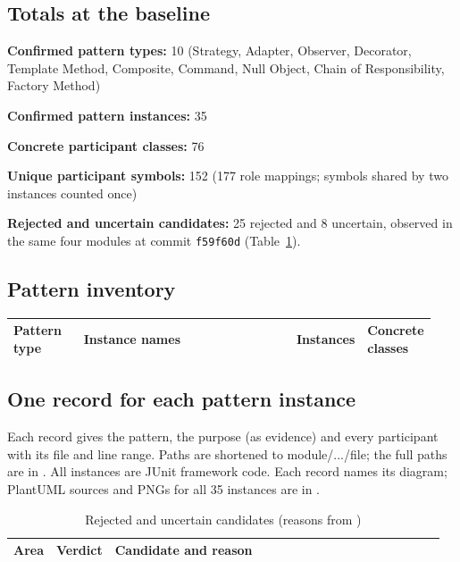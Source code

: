 \documentclass[11pt,a4paper]{article}
\newcommand{\entry}[1]{\textbf{#1:} }
\begin{document}
\subsection{Totals at the baseline}
\entry{Confirmed pattern types}10 (Strategy, Adapter, Observer, Decorator, Template Method, Composite, Command, Null Object, Chain of Responsibility, Factory Method)\par
\entry{Confirmed pattern instances}35\par
\entry{Concrete participant classes}76\par
\entry{Unique participant symbols}152 (177 role mappings; symbols shared by two instances counted once)\par
\entry{Rejected and uncertain candidates}25 rejected and 8 uncertain, observed in the same four modules at commit \texttt{f59f60d} (Table~\ref{tab:rejected}).

\subsection{Pattern inventory}
\begin{longtable}{@{}p{0.17\linewidth}p{0.57\linewidth}p{0.09\linewidth}p{0.11\linewidth}@{}}\toprule
Pattern type & Instance names & Instances & Concrete classes\\\midrule\endhead
\bottomrule\end{longtable}

\subsection{One record for each pattern instance}
Each record gives the pattern, the purpose (as evidence) and every participant with its file and line range. Paths are shortened to module/.../file; the full paths are in . All instances are JUnit framework code. Each record names its diagram; PlantUML sources and PNGs for all 35 instances are in .


\begin{longtable}{@{}p{0.06\linewidth}p{0.11\linewidth}p{0.79\linewidth}@{}}
\caption{Rejected and uncertain candidates (reasons from \protect{})}\label{tab:rejected}\\\toprule
Area & Verdict & Candidate and reason\\\midrule\endhead
\bottomrule\end{longtable}
\end{document}
